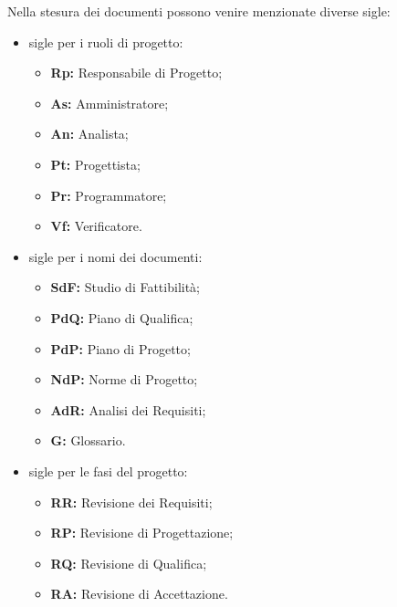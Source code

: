         Nella stesura dei documenti possono venire menzionate diverse sigle:
        \begin{itemize}
          \item sigle per i ruoli di progetto:
            \begin{itemize}
              \item \textbf{Rp:} Responsabile di Progetto;
              \item \textbf{As:} Amministratore;
              \item \textbf{An:} Analista;
              \item \textbf{Pt:} Progettista;
              \item \textbf{Pr:} Programmatore;
              \item \textbf{Vf:} Verificatore.
            \end{itemize}
          \item sigle per i nomi dei documenti:
            \begin{itemize}
              \item \textbf{SdF:} Studio di Fattibilità;
              \item \textbf{PdQ:} Piano di Qualifica;
              \item \textbf{PdP:} Piano di Progetto;
              \item \textbf{NdP:} Norme di Progetto;
              \item \textbf{AdR:} Analisi dei Requisiti;
              \item \textbf{G:} Glossario.
            \end{itemize}
          \item sigle per le fasi del progetto:
            \begin{itemize}
              \item \textbf{RR:} Revisione dei Requisiti;
              \item \textbf{RP:} Revisione di Progettazione;
              \item \textbf{RQ:} Revisione di Qualifica;
              \item \textbf{RA:} Revisione di Accettazione.
            \end{itemize}
        \end{itemize}


